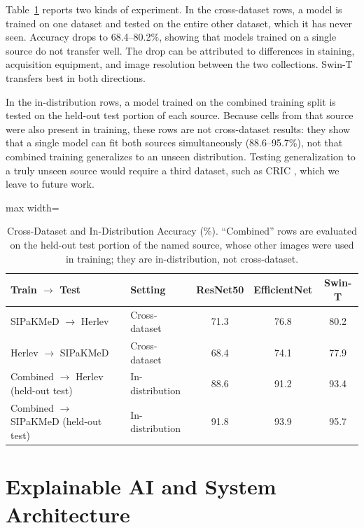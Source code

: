 \documentclass[conference]{IEEEtran}
\begin{document}
Table~\ref{tab:cross} reports two kinds of experiment. In the cross-dataset rows, a model is trained on one dataset and tested on the entire other dataset, which it has never seen. Accuracy drops to 68.4--80.2\%, showing that models trained on a single source do not transfer well. The drop can be attributed to differences in staining, acquisition equipment, and image resolution between the two collections. Swin-T transfers best in both directions.

In the in-distribution rows, a model trained on the combined training split is tested on the held-out test portion of each source. Because cells from that source were also present in training, these rows are not cross-dataset results: they show that a single model can fit both sources simultaneously (88.6--95.7\%), not that combined training generalizes to an unseen distribution. Testing generalization to a truly unseen source would require a third dataset, such as CRIC \cite{rezende2021cric}, which we leave to future work.

\begin{table}[t]
\caption{Cross-Dataset and In-Distribution Accuracy (\%). ``Combined'' rows are evaluated on the held-out test portion of the named source, whose other images were used in training; they are in-distribution, not cross-dataset.}
\label{tab:cross}
\centering
\setlength{\tabcolsep}{3.5pt}
\begin{adjustbox}{max width=\columnwidth}
\begin{tabular}{llccc}
\toprule
\textbf{Train $\to$ Test} & \textbf{Setting} & \textbf{ResNet50} & \textbf{EfficientNet} & \textbf{Swin-T}\\
\midrule
SIPaKMeD $\to$ Herlev                   & Cross-dataset   & 71.3 & 76.8 & 80.2\\
Herlev $\to$ SIPaKMeD                   & Cross-dataset   & 68.4 & 74.1 & 77.9\\
\midrule
Combined $\to$ Herlev (held-out test)   & In-distribution & 88.6 & 91.2 & 93.4\\
Combined $\to$ SIPaKMeD (held-out test) & In-distribution & 91.8 & 93.9 & 95.7\\
\bottomrule
\end{tabular}
\end{adjustbox}
\end{table}

\section{Explainable AI and System Architecture}
\label{sec:xai}
\end{document}
